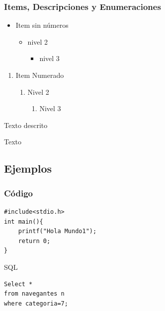 \documentclass[aspectratio=169]{beamer}%
\begin{document}
\begin{frame}[fragile]
	\frametitle{Items, Descripciones y Enumeraciones}
	\justifying
	\transdissolve
	\begin{itemize}\justifying
		\item Item sin números
		\begin{itemize}\justifying
			\item nivel 2
			\begin{itemize}\justifying
				\item nivel 3
			\end{itemize}
		\end{itemize}
	\end{itemize}

	\begin{enumerate}\justifying
		\item Item Numerado
		\begin{enumerate}\justifying
			\item Nivel 2
			\begin{enumerate}\justifying
				\item Nivel 3
			\end{enumerate}
		\end{enumerate}
	\end{enumerate}

	\begin{description}\justifying
		\item[Descripción] Texto descrito
		\begin{description}\justifying
			\item[Nivel 2] Texto
		\end{description}

	\end{description}
\end{frame}




\subsection{Ejemplos}
\begin{frame}[fragile]
	\justifying
	\frametitle{Código}
	\lstset{language=C}
	\begin{lstlisting}
#include<stdio.h>
int main(){
	printf("Hola Mundo1");
	return 0;
}
	\end{lstlisting}
	\begin{block}{SQL}%
		\lstset{language=SQL}
		\begin{lstlisting}
Select *
from navegantes n
where categoria=7;
		\end{lstlisting}%
	\end{block}

\end{frame}
\end{document}

